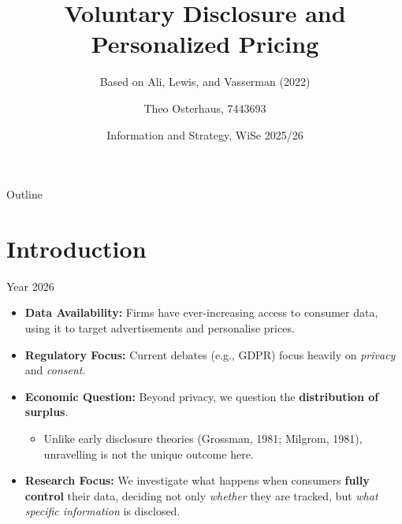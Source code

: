 \documentclass{beamer}
\title[Voluntary Disclosure, Personalized Pricing]{Voluntary Disclosure and Personalized Pricing}
\subtitle{Based on Ali, Lewis, and Vasserman (2022)}
\author[Theo Osterhaus]{Theo Osterhaus, 7443693}
\date[22.01.2025]{Information and Strategy, WiSe 2025/26}
\institute[WiSo]{
  Department of Economics\\
  Universität zu Köln
}
\begin{document}
\frame{\titlepage}



\begin{frame}{Outline}
    \tableofcontents
\end{frame}


\section{Introduction}
\begin{frame}{Year 2026}
    \begin{itemize}
        \setlength\itemsep{1em}
        \item \textbf{Data Availability:} Firms have ever-increasing access to consumer data, using it to target advertisements and personalise prices.
        
        \item \textbf{Regulatory Focus:} Current debates (e.g., GDPR) focus heavily on \textit{privacy} and \textit{consent}.
        
        \item \textbf{Economic Question:} Beyond privacy, we question the \textbf{distribution of surplus}. 
        \begin{itemize}
            \item Unlike early disclosure theories (Grossman, 1981; Milgrom, 1981), unravelling is not the unique outcome here.
        \end{itemize}

        \item \textbf{Research Focus:}
        We investigate what happens when consumers \textbf{fully control} their data, deciding not only \textit{whether} they are tracked, but \textit{what specific information} is disclosed.
    \end{itemize}
\end{frame}
\end{document}
